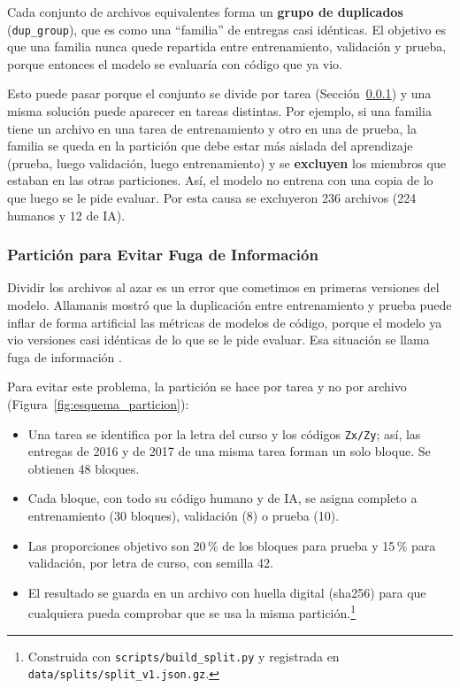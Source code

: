 Cada conjunto de archivos equivalentes forma un \textbf{grupo de duplicados} (\texttt{dup\_group}), que es como una ``familia'' de entregas casi idénticas. El objetivo es que una familia nunca quede repartida entre entrenamiento, validación y prueba, porque entonces el modelo se evaluaría con código que ya vio.

Esto puede pasar porque el conjunto se divide por tarea (Sección~\ref{subsec:particion_datos}) y una misma solución puede aparecer en tareas distintas. Por ejemplo, si una familia tiene un archivo en una tarea de entrenamiento y otro en una de prueba, la familia se queda en la partición que debe estar más aislada del aprendizaje (prueba, luego validación, luego entrenamiento) y se \textbf{excluyen} los miembros que estaban en las otras particiones. Así, el modelo no entrena con una copia de lo que luego se le pide evaluar. Por esta causa se excluyeron 236 archivos (224 humanos y 12 de IA).

\subsubsection{Partición para Evitar Fuga de Información}
\label{subsec:particion_datos}

Dividir los archivos al azar es un error que cometimos en primeras versiones del modelo. Allamanis \cite{Allamanis2019Adverse} mostró que la duplicación entre entrenamiento y prueba puede inflar de forma artificial las métricas de modelos de código, porque el modelo ya vio versiones casi idénticas de lo que se le pide evaluar. Esa situación se llama fuga de información \cite{Kapoor2023Leakage}.

Para evitar este problema, la partición se hace por tarea y no por archivo (Figura~\ref{fig:esquema_particion}):

\begin{itemize}
    \item Una tarea se identifica por la letra del curso y los códigos \texttt{Zx/Zy}; así, las entregas de 2016 y de 2017 de una misma tarea forman un solo bloque. Se obtienen 48 bloques.
    \item Cada bloque, con todo su código humano y de IA, se asigna completo a entrenamiento (30 bloques), validación (8) o prueba (10).
    \item Las proporciones objetivo son 20\,\% de los bloques para prueba y 15\,\% para validación, por letra de curso, con semilla 42.
    \item El resultado se guarda en un archivo con huella digital (sha256) para que cualquiera pueda comprobar que se usa la misma partición.\footnote{Construida con \texttt{scripts/build\_split.py} y registrada en \texttt{data/splits/split\_v1.json.gz}.}
\end{itemize}


